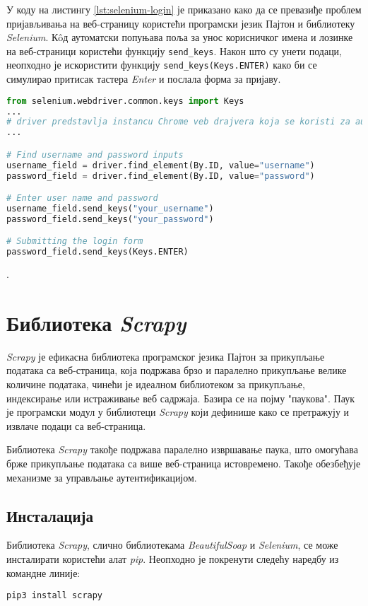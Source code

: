 \documentclass[12pt,oneside]{memoir}
\begin{document}
У коду на листингу \ref{lst:selenium-login} је приказано како да се превазиђе проблем пријављивања на веб-страницу користећи програмски језик Пајтон и библиотеку \textit{Selenium}. Кôд аутоматски попуњава поља за унос корисничког имена и лозинке на веб-страници користећи функцију \texttt{send\_keys}. Након што су унети подаци, неопходно је искористити функцију \texttt{send\_keys(Keys.ENTER)} како би се симулирао притисак тастера \textit{Enter} и послала форма за пријаву.

\begin{lstlisting}[language=Python, caption={Пријављивање на веб-страници}, label={lst:selenium-login}]
from selenium.webdriver.common.keys import Keys
...
# driver predstavlja instancu Chrome veb drajvera koja se koristi za automatizaciju pregledaca
...

# Find username and password inputs
username_field = driver.find_element(By.ID, value="username")
password_field = driver.find_element(By.ID, value="password")

# Enter user name and password
username_field.send_keys("your_username")
password_field.send_keys("your_password")

# Submitting the login form
password_field.send_keys(Keys.ENTER)
\end{lstlisting}.

\section{Библиотека \textit{Scrapy}}
\textit{Scrapy} је ефикасна библиотека програмског језика Пајтон за прикупљање података са веб-страница, која подржава брзо и паралелно прикупљање велике количине података, чинећи је идеалном библиотеком за прикупљање, индексирање или истраживање веб садржаја. Базира се на појму "паукова". Паук је програмски модул у библиотеци \textit{Scrapy} који дефинише како се претражују и извлаче подаци са веб-страница.

Библиотека \textit{Scrapy} такође подржава паралелно извршавање паука, што омогућава брже прикупљање података са више веб-страница истовремено. Такође обезбеђује механизме за управљање аутентификацијом.

\subsection{Инсталација}
Библиотека \textit{Scrapy}, слично библиотекама \textit{BeautifulSoap} и \textit{Selenium}, се може инсталирати користећи алат \textit{pip}. Неопходно је покренути следећу наредбу из командне линије:
\begin{verbatim}
pip3 install scrapy
\end{verbatim}
\end{document}
